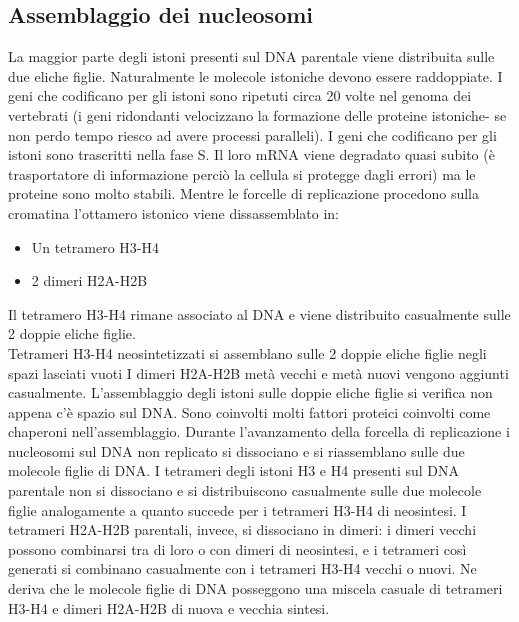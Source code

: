 \documentclass{article}
\begin{document}
\subsection{Assemblaggio dei nucleosomi} La maggior parte degli istoni presenti sul DNA parentale viene distribuita sulle due eliche figlie. Naturalmente le molecole istoniche devono essere
raddoppiate. 
I geni che codificano per gli istoni sono ripetuti circa 20 volte nel genoma dei vertebrati (i geni ridondanti velocizzano la formazione delle proteine istoniche- se non perdo tempo riesco ad avere processi paralleli).
I geni che codificano per gli istoni sono trascritti nella fase S. 
Il loro mRNA viene degradato quasi subito (è trasportatore di informazione perciò la cellula si protegge dagli errori) ma le proteine sono molto stabili. 
Mentre le forcelle di replicazione procedono sulla cromatina l'ottamero istonico viene dissassemblato in:
\begin{itemize}
    \item Un tetramero H3-H4
    \item 2 dimeri H2A-H2B
\end{itemize}
Il tetramero H3-H4 rimane associato al DNA e viene distribuito casualmente sulle 2 doppie eliche figlie.\\
Tetrameri H3-H4 neosintetizzati si assemblano sulle 2 doppie eliche figlie negli spazi lasciati vuoti
I dimeri H2A-H2B metà vecchi e metà nuovi vengono aggiunti casualmente. L'assemblaggio degli istoni sulle doppie eliche figlie si verifica
non appena c'è spazio sul DNA. Sono coinvolti molti fattori proteici coinvolti come chaperoni nell'assemblaggio.
Durante l'avanzamento della forcella di replicazione i nucleosomi sul DNA non replicato si
dissociano e si riassemblano sulle due molecole figlie di DNA. I tetrameri degli istoni H3 e H4
presenti sul DNA parentale non si dissociano e si distribuiscono casualmente sulle due
molecole figlie analogamente a quanto succede per i tetrameri H3-H4 di neosintesi. I
tetrameri H2A-H2B parentali, invece, si dissociano in dimeri: i dimeri vecchi possono
combinarsi tra di loro o con dimeri di neosintesi, e i tetrameri così generati si combinano
casualmente con i tetrameri H3-H4 vecchi o nuovi. Ne deriva che le molecole figlie di DNA
posseggono una miscela casuale di tetrameri H3-H4 e dimeri H2A-H2B di nuova e vecchia sintesi.
\end{document}
